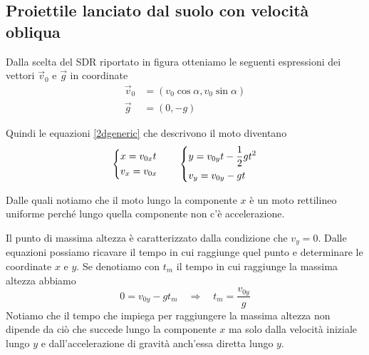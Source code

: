 \documentclass{article}
\begin{document}
\subsection{Proiettile lanciato dal suolo con velocità obliqua}
\begin{center}
\end{center}

Dalla scelta del SDR riportato in figura otteniamo le seguenti espressioni dei vettori $\Vec{v}_0$ e $\Vec{g}$ in coordinate
\begin{align}
  \Vec{v}_0 &= (v_0 \cos \alpha, v_0 \sin \alpha)\\
  \Vec{g} &= (0, -g)
\end{align}

Quindi le equazioni \ref{2dgeneric} che descrivono il moto diventano
\begin{equation}
  \begin{dcases}
    x = v_{0x} t \\
    v_x = v_{0x}
  \end{dcases}
  \qquad
  \begin{dcases}
    y = v_{0y} t - \frac{1}{2}gt^2 \\
    v_y = v_{0y} - gt
  \end{dcases}
\end{equation}

Dalle quali notiamo che il moto lungo la componente $x$ è un moto rettilineo uniforme perché lungo quella componente non c'è accelerazione.

Il punto di massima altezza è caratterizzato dalla condizione che $v_y =0$. Dalle equazioni possiamo ricavare il tempo in cui raggiunge quel punto e determinare le coordinate $x$ e $y$.
Se denotiamo con $t_m$ il tempo in cui raggiunge la massima altezza abbiamo
\begin{equation}
  0 = v_{0y} -gt_m \quad\Rightarrow\quad t_m = \frac{v_{0y}}{g}
\end{equation}
Notiamo che il tempo che impiega per raggiungere la massima altezza non dipende da ciò che succede lungo la componente $x$ ma solo dalla velocità iniziale lungo $y$ e dall'accelerazione di gravità anch'essa diretta lungo $y$.
\end{document}
